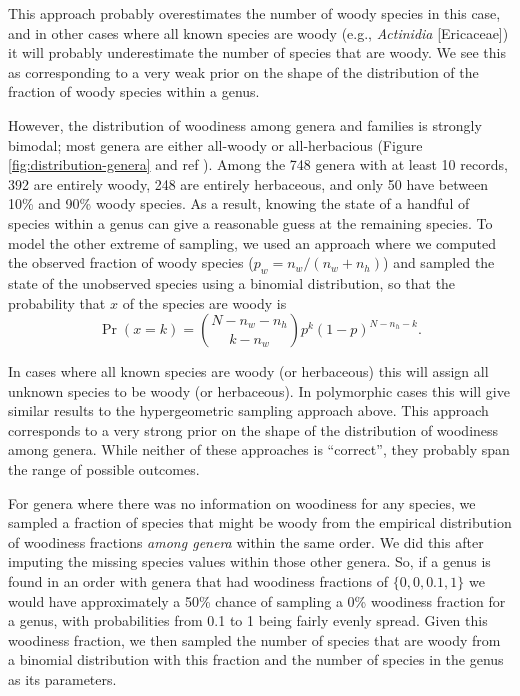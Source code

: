 \documentclass[12pt]{article}
\begin{document}
This approach probably overestimates the number of woody species in
this case, and in other cases where all known species are woody (e.g.,
\textit{Actinidia} [Ericaceae]) it will probably underestimate the
number of species that are woody. We see this as corresponding to a
very weak prior on the shape of the distribution of the fraction of
woody species within a genus.

However, the distribution of woodiness among genera and families is
strongly bimodal; most genera are either all-woody or all-herbacious
(Figure \ref{fig:distribution-genera} and ref
\citep{sinnott1915evolution}).  Among the 748 genera with at least 10
records, 392 are entirely woody, 248 are entirely herbaceous, and only
50 have between 10\% and 90\% woody species. As a result, knowing the
state of a handful of species within a genus can give a reasonable
guess at the remaining species.
To model the other extreme of sampling, we used an approach where we
computed the observed fraction of woody species ($p_w = n_w / (n_w +
n_h)$) and sampled the state of the unobserved species using a
binomial distribution, so that the probability that $x$ of the species
are woody is
\begin{equation}
  \Pr(x = k) = {N - n_w - n_h \choose k - n_w} 
  p^k (1-p)^{N - n_h - k}.
\end{equation}

In cases where all known species are woody (or herbaceous) this will
assign all unknown species to be woody (or herbaceous). In polymorphic
cases this will give similar results to the hypergeometric sampling
approach above. This approach corresponds to a very strong prior on
the shape of the distribution of woodiness among genera.
While neither of these approaches is ``correct'', they probably
span the range of possible outcomes.

For genera where there was no information on woodiness for any
species, we sampled a fraction of species that might be woody from the
empirical distribution of woodiness fractions \textit{among genera}
within the same order. We did this after imputing the missing species
values within those other genera. So, if a genus is found in an order
with genera that had woodiness fractions of $\{0, 0, 0.1, 1\}$ we would
have approximately a 50\% chance of sampling a 0\% woodiness fraction
for a genus, with probabilities from 0.1 to 1 being fairly evenly
spread.  Given this woodiness fraction, we then sampled the number of
species that are woody from a binomial distribution with this fraction
and the number of species in the genus as its parameters.
\end{document}
